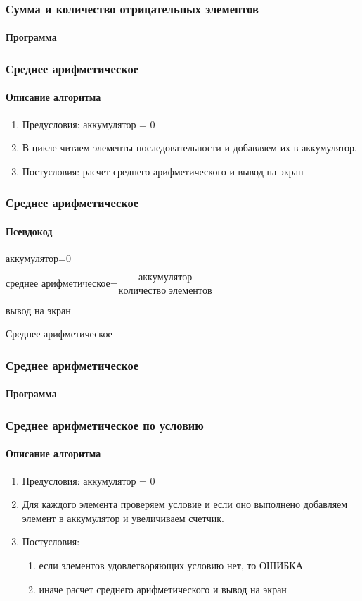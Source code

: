 \begin{frame}[fragile]
\frametitle{Сумма и количество отрицательных элементов}
\framesubtitle{Программа}

\end{frame}


\begin{frame}[fragile]
\frametitle{Среднее арифметическое}
\framesubtitle{Описание алгоритма}
\begin{enumerate}
	\item Предусловия: аккумулятор = 0
	\item В цикле читаем элементы последовательности и добавляем их в аккумулятор.
	\item Постусловия: расчет среднего арифметического и вывод на экран
\end{enumerate}


\end{frame}

\begin{frame}[fragile]
\frametitle{Среднее арифметическое}
\framesubtitle{Псевдокод}

\begin{algorithm}[H]
		\SetAlgoLined
		аккумулятор=0\;
		
	среднее арифметическое=$\dfrac{аккумулятор}{количество\;элементов}$
	
	вывод на экран\;
	
	\caption{Среднее арифметическое}
\end{algorithm}


\end{frame}


\begin{frame}[fragile]
\frametitle{Среднее арифметическое}
\framesubtitle{Программа}



\end{frame}


\begin{frame}[fragile]
\frametitle{Среднее арифметическое по условию}
\framesubtitle{Описание алгоритма}
\begin{enumerate}
	\item Предусловия: аккумулятор = 0
	\item Для каждого элемента проверяем условие и если оно выполнено добавляем элемент в аккумулятор и увеличиваем счетчик.
	\item Постусловия: 
	\begin{enumerate}
		\item если элементов удовлетворяющих условию нет, то ОШИБКА
		\item иначе расчет среднего арифметического и вывод на экран
	\end{enumerate}
	
\end{enumerate}


\end{frame}


